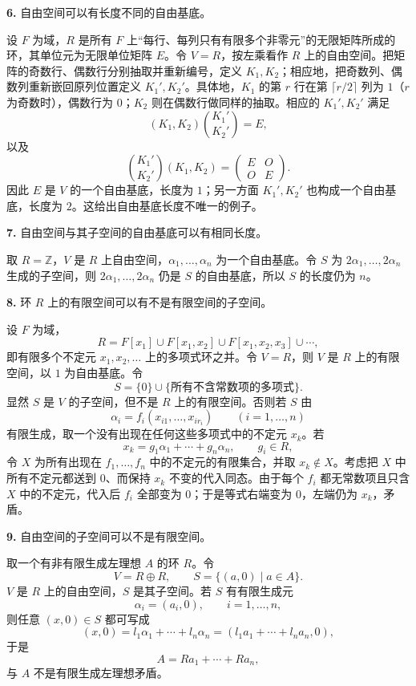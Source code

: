 \textbf{6.} 自由空间可以有长度不同的自由基底。

设 $F$ 为域，$R$ 是所有 $F$ 上“每行、每列只有有限多个非零元”的无限矩阵所成的环，其单位元为无限单位矩阵 $E$。令 $V=R$，按左乘看作 $R$ 上的自由空间。把矩阵的奇数行、偶数行分别抽取并重新编号，定义 $K_1,K_2$；相应地，把奇数列、偶数列重新嵌回原列位置定义 $K_1',K_2'$。具体地，$K_1$ 的第 $r$ 行在第 $\lceil r/2\rceil$ 列为 $1$（$r$ 为奇数时），偶数行为 $0$；$K_2$ 则在偶数行做同样的抽取。相应的 $K_1',K_2'$ 满足
\[
(K_1,K_2)
\binom{K_1'}{K_2'}=E,
\]
以及
\[
\binom{K_1'}{K_2'}(K_1,K_2)
=\begin{pmatrix}E&O\\O&E\end{pmatrix}.
\]
因此 $E$ 是 $V$ 的一个自由基底，长度为 $1$；另一方面 $K_1',K_2'$ 也构成一个自由基底，长度为 $2$。这给出自由基底长度不唯一的例子。

\textbf{7.} 自由空间与其子空间的自由基底可以有相同长度。

取 $R=\mathbb Z$，$V$ 是 $R$ 上自由空间，$\alpha_1,\ldots,\alpha_n$ 为一个自由基底。令 $S$ 为 $2\alpha_1,\ldots,2\alpha_n$ 生成的子空间，则 $2\alpha_1,\ldots,2\alpha_n$ 仍是 $S$ 的自由基底，所以 $S$ 的长度仍为 $n$。

\textbf{8.} 环 $R$ 上的有限空间可以有不是有限空间的子空间。

设 $F$ 为域，
\[
R=F[x_1]\cup F[x_1,x_2]\cup F[x_1,x_2,x_3]\cup\cdots,
\]
即有限多个不定元 $x_1,x_2,\ldots$ 上的多项式环之并。令 $V=R$，则 $V$ 是 $R$ 上的有限空间，以 $1$ 为自由基底。令
\[
S=\{0\}\cup\{\text{所有不含常数项的多项式}\}.
\]
显然 $S$ 是 $V$ 的子空间，但不是 $R$ 上的有限空间。否则若 $S$ 由
\[
\alpha_i=f_i(x_{i1},\ldots,x_{i r_i})\qquad(i=1,\ldots,n)
\]
有限生成，取一个没有出现在任何这些多项式中的不定元 $x_k$。若
\[
x_k=g_1\alpha_1+\cdots+g_n\alpha_n,
\qquad g_i\in R,
\]
令 $X$ 为所有出现在 $f_1,\ldots,f_n$ 中的不定元的有限集合，并取 $x_k\notin X$。考虑把 $X$ 中所有不定元都送到 $0$、而保持 $x_k$ 不变的代入同态。由于每个 $f_i$ 都无常数项且只含 $X$ 中的不定元，代入后 $f_i$ 全部变为 $0$；于是等式右端变为 $0$，左端仍为 $x_k$，矛盾。

\textbf{9.} 自由空间的子空间可以不是有限空间。

取一个有非有限生成左理想 $A$ 的环 $R$。令
\[
V=R\oplus R,
\qquad
S=\{(a,0)\mid a\in A\}.
\]
$V$ 是 $R$ 上的自由空间，$S$ 是其子空间。若 $S$ 有有限生成元
\[
\alpha_i=(a_i,0),\qquad i=1,\ldots,n,
\]
则任意 $(x,0)\in S$ 都可写成
\[
(x,0)=l_1\alpha_1+\cdots+l_n\alpha_n
=(l_1a_1+\cdots+l_na_n,0),
\]
于是
\[
A=Ra_1+\cdots+Ra_n,
\]
与 $A$ 不是有限生成左理想矛盾。

